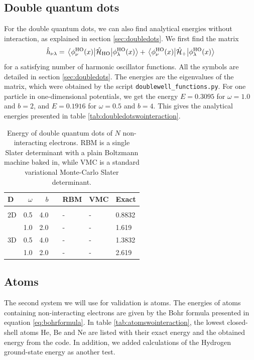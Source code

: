 \subsection{Double quantum dots}
For the double quantum dots, we can also find analytical energies without interaction, as explained in section \ref{sec:doubledots}. We first find the matrix 
\begin{equation*}
\hat{h}_{\nu\lambda}=\mel{\phi_{\nu}^{\text{HO}}(x)}{\hat{\mathcal{H}}_{\text{HO}}}{\phi_{\lambda}^{\text{HO}}(x)}+\mel{\phi_{\nu}^{\text{HO}}(x)}{\hat{\mathcal{H}}_{\text{+}}}{\phi_{\lambda}^{\text{HO}}(x)}
\end{equation*}
for a satisfying number of harmonic oscillator functions. All the symbols are detailed in section \ref{sec:doubledots}. The energies are the eigenvalues of the matrix, which were obtained by the script \texttt{doublewell\_functions.py}. For one particle in one-dimensional potentials, we get the energy $E=0.3095$ for $\omega=1.0$ and $b=2$, and $E=0.1916$ for $\omega=0.5$ and $b=4$. This gives the analytical energies presented in table \eqref{tab:doubledotswointeraction}. 
\begin{table} [H]
	\caption{Energy of double quantum dots of $N$ non-interacting electrons. RBM is a single Slater determinant with a plain Boltzmann machine baked in, while VMC is a standard variational Monte-Carlo Slater determinant.}
	\label{tab:doubledotswointeraction}
	\begin{tabularx}{\textwidth}{lrrrR{3.5cm}R{3.5cm}R{3.5cm}} \hline\hline
		D & $\omega$ & $b$ & \makecell{\\ \phantom{=}} & RBM & VMC & Exact \\ \hline \\
		
		2D & 0.5 & 4.0 && - & - & 0.8832 \\
		& 1.0 & 2.0 && - & - & 1.619 \\
		3D & 0.5 & 4.0 && - & - & 1.3832 \\
		& 1.0 & 2.0 && - & - & 2.619 \\ \hline\hline
	\end{tabularx}
\end{table}

\subsection{Atoms}
The second system we will use for validation is atoms. The energies of atoms containing non-interacting electrons are given by the Bohr formula presented in equation \eqref{eq:bohrformula}. In table \eqref{tab:atomswointeraction}, the lowest closed-shell atoms He, Be and Ne are listed with their exact energy and the obtained energy from the code. In addition, we added calculations of the Hydrogen ground-state energy as another test.

